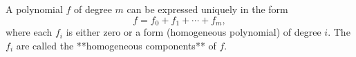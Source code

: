 A polynomial $f$ of degree $m$ can be expressed uniquely in the form
$$f = f_0 + f_1 + \cdots + f_m,$$
where each $f_i$ is either zero or a form (homogeneous polynomial) of degree $i$. The $f_i$ are called the **homogeneous components** of $f$.
